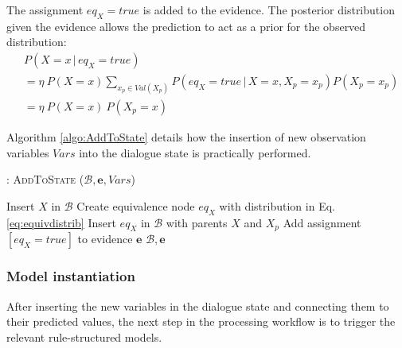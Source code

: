 The assignment $\mathit{eq}_{X} \!=\! true$ is added to the evidence. The posterior distribution given the evidence allows the prediction to act as a prior for the observed distribution:
\begin{align}
&P(X = x \, | \, \mathit{eq}_{X}\!=\!true) \nonumber \\
&=  \eta \ P(X\!=\!x)  \sum_{x_p \in \mathit{Val}(X_p)} P(\mathit{eq}_{X}\!=\!true\, |\, X\!=\!x, X_p \!=\!x_p ) P(X_p\!=\!x_p) \\
&= \eta \ P(X\!=\!x) \ P(X_p\!=\!x) \label{eq:equivalence}
\end{align}


Algorithm \ref{algo:AddToState} details how the insertion of new observation variables $\mathit{Vars}$ into the dialogue state is practically performed. 

\begin{algorithm}[h]
\caption{: \textsc{AddToState} ($\mathcal{B}, \mathbf{e}, \mathit{Vars}$)}
\begin{algorithmic}[1] \vspace{1mm}
\STATE Insert $X$ in $\mathcal{B}$ 
\ENDIF
{}
\STATE Create equivalence node $\mathit{eq}_{X}$ with distribution in Eq. \eqref{eq:equivdistrib}
\STATE Insert $\mathit{eq}_{X}$ in $\mathcal{B}$ with parents $\mathit{X}$ and $\mathit{X}_p$
\STATE Add assignment $[\mathit{eq}_{X}\!=\!true]$ to evidence $\mathbf{e}$
\ENDIF
\ENDFOR
\RETURN $\mathcal{B}, \mathbf{e}$
\end{algorithmic}
\label{algo:AddToState}
\end{algorithm}



\subsubsection*{Model instantiation}

After inserting the new variables in the dialogue state and connecting them to their predicted values, the next step in the processing workflow is to trigger the relevant rule-structured models. 

